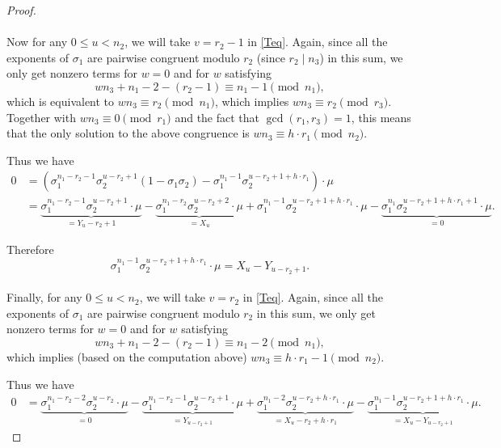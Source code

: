 \documentclass[12pt,a4paper]{article}
\theoremstyle{definition}
\begin{document}
\begin{proof}
\paragraph*{}
Now for any $0\leq u< n_2$, we will take $v=r_2-1$ in \eqref{Teq}. Again, since all the exponents of $\sigma_1$ are pairwise congruent modulo $r_2$ (since $r_2\mid n_3$) in this sum, we only get nonzero terms for $w=0$ and for $w$ satisfying
$$wn_3+n_1-2-(r_2-1)\equiv n_1-1 \pmod{n_1},$$
which is equivalent to $wn_3\equiv r_2\pmod{n_1}$, which implies $wn_3\equiv r_2\pmod{r_3}$. Together with $wn_3\equiv 0\pmod{r_1}$ and the fact that $\gcd(r_1,r_3)=1$, this means that the only solution to the above congruence is $wn_3\equiv h\cdot r_1\pmod{n_2}$.

Thus we have 
\begin{align*}
0&=\left(\sigma_1^{n_1-r_2-1}\sigma_2^{u-r_2+1}(1-\sigma_1\sigma_2)-\sigma_1^{n_1-1}\sigma_2^{u-r_2+1+h\cdot r_1}\right)\cdot \mu\\
&=\underbrace{\sigma_1^{n_1-r_2-1}\sigma_2^{u-r_2+1}\cdot\mu}_{=Y_u-r_2+1}-\underbrace{\sigma_1^{n_1-r_2}\sigma_2^{u-r_2+2}\cdot\mu}_{=X_u}+\sigma_1^{n_1-1}\sigma_2^{u-r_2+1+h\cdot r_1}\cdot \mu-\underbrace{\sigma_1^{n_1}\sigma_2^{u-r_2+1+h\cdot r_1+1}\cdot \mu}_{=0}.
\end{align*}

Therefore
\begin{equation}\label{indXY}
\sigma_1^{n_1-1}\sigma_2^{u-r_2+1+h\cdot r_1}\cdot \mu = X_u -Y_{u-r_2+1}.
\end{equation}

\paragraph*{}
Finally, for any $0\leq u< n_2$, we will take $v=r_2$ in \eqref{Teq}. Again, since all the exponents of $\sigma_1$ are pairwise congruent modulo $r_2$ in this sum, we only get nonzero terms for $w=0$ and for $w$ satisfying
$$wn_3+n_1-2-(r_2-1)\equiv n_1-2 \pmod{n_1},$$ which implies (based on the computation above) $wn_3\equiv h\cdot r_1-1\pmod{n_2}$.

Thus we have 
\begin{align*}
0&=\underbrace{\sigma_1^{n_1-r_2-2}\sigma_2^{u-r_2}\cdot\mu}_{=0}-\underbrace{\sigma_1^{n_1-r_2-1}\sigma_2^{u-r_2+1}\cdot\mu}_{=Y_{u-r_2+1}}
+\underbrace{\sigma_1^{n_1-2}\sigma_2^{u-r_2+h\cdot r_1}\cdot \mu}_{=X_u-r_2+h\cdot r_1}-\underbrace{\sigma_1^{n_1-1}\sigma_2^{u-r_2+1+h\cdot r_1}\cdot \mu}_{=X_u-Y_{u-r_2+1}}.
\end{align*}


\end{proof}
\end{document}

